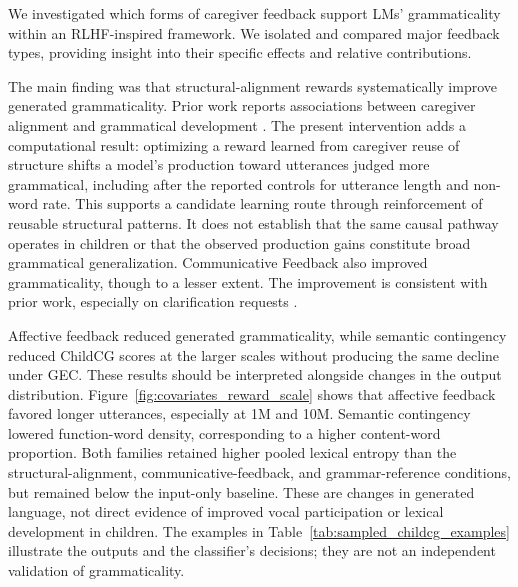 We investigated which forms of caregiver feedback support LMs' grammaticality within an RLHF-inspired framework. We isolated and compared major feedback types, providing insight into their specific effects and relative contributions.

The main finding was that structural-alignment rewards systematically improve generated grammaticality. Prior work reports associations between caregiver alignment and grammatical development \cite{fusaroli_caregiver_2023}. The present intervention adds a computational result: optimizing a reward learned from caregiver reuse of structure shifts a model's production toward utterances judged more grammatical, including after the reported controls for utterance length and non-word rate. This supports a candidate learning route through reinforcement of reusable structural patterns. It does not establish that the same causal pathway operates in children or that the observed production gains constitute broad grammatical generalization.
Communicative Feedback also improved grammaticality, though to a lesser extent. The improvement is consistent with prior work, especially on clarification requests \cite{nikolaus_fourtassi_2026, clark_conversational_2020}. 

Affective feedback reduced generated grammaticality, while semantic contingency reduced ChildCG scores at the larger scales without producing the same decline under GEC. These results should be interpreted alongside changes in the output distribution.
Figure~\ref{fig:covariates_reward_scale} shows that affective feedback favored longer utterances, especially at 1M and 10M. Semantic contingency lowered function-word density, corresponding to a higher content-word proportion. Both families retained higher pooled lexical entropy than the structural-alignment, communicative-feedback, and grammar-reference conditions, but remained below the input-only baseline. These are changes in generated language, not direct evidence of improved vocal participation or lexical development in children. The examples in Table~\ref{tab:sampled_childcg_examples} illustrate the outputs and the classifier's decisions; they are not an independent validation of grammaticality.

